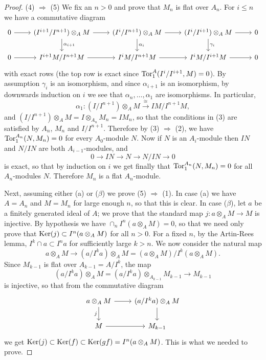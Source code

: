 \begin{proof}
(4) $\Rightarrow$ (5) We fix an $n > 0$ and prove that $M_n$ is flat over $A_n$. For
$i \le n$ we have a commutative diagram
\[
\begin{tikzcd}
0 \arrow[r] &
(I^{i+1}/I^{n+1}) \otimes_A M \arrow[r] \arrow[d, "\alpha_{i+1}"] &
(I^i/I^{n+1}) \otimes_A M \arrow[r] \arrow[d, "\alpha_i"] &
(I^i/I^{i+1}) \otimes_A M \arrow[r] \arrow[d, "\gamma_i"] & 0 \\
0 \arrow[r] &
I^{i+1}M/I^{n+1}M \arrow[r] &
I^iM/I^{n+1}M \arrow[r] &
I^iM/I^{i+1}M \arrow[r] & 0
\end{tikzcd}
\]
with exact rows (the top row is exact since $\operatorname{Tor}^A_1(I^i/I^{i+1}, M) = 0$). By
assumption $\gamma_i$ is an isomorphism, and since $\alpha_{i+1}$ is an isomorphism,
by downwards induction on $i$ we see that $\alpha_n, \ldots, \alpha_1$ are
isomorphisms. In particular,
\[
  \alpha_1\colon (I/I^{n+1}) \otimes_A M \xrightarrow{\cong} IM/I^{n+1}M,
\]
and $(I/I^{n+1}) \otimes_A M = I \otimes_{A_n} M_n = IM_n$,
so that the conditions in (3) are satisfied by $A_n$, $M_n$ and $I/I^{n+1}$.
Therefore by (3) $\Rightarrow$ (2), we have $\operatorname{Tor}^{A_n}_1(N, M_n) = 0$ for every
$A_0$-module $N$. Now if $N$ is an $A_i$-module then $IN$ and $N/IN$ are both
$A_{i-1}$-modules, and
\[
  0 \to IN \to N \to N/IN \to 0
\]
is exact, so that by induction on $i$ we get finally that $\operatorname{Tor}^{A_n}_1(N, M_n) = 0$
for all $A_n$-modules $N$. Therefore $M_n$ is a flat $A_n$-module.

Next, assuming either (a) or ($\beta$) we prove (5) $\Rightarrow$ (1). In case (a) we have
$A = A_n$ and $M = M_n$ for large enough $n$, so that this is clear. In case
($\beta$), let $a$ be a finitely generated ideal of $A$; we prove that the standard map
$j\colon a \otimes_A M \to M$ is injective. By hypothesis we have
$\cap_n I^n(a \otimes_A M) = 0$, so that we need only prove that $\operatorname{Ker}(j) \subset
I^n(a \otimes_A M)$ for all $n > 0$. For a fixed $n$, by the Artin-Rees lemma,
$I^k \cap a \subset I^na$ for sufficiently large $k > n$. We now consider the
natural map
\[
  a \otimes_A M \to (a/I^ka) \otimes_A M = (a \otimes_A M)/I^k(a \otimes_A M).
\]
Since $M_{k-1}$ is flat over $A_{k-1} = A/I^k$, the map
\[
  (a/I^ka) \otimes_A M = (a/I^ka) \otimes_{A_{k-1}} M_{k-1} \to M_{k-1}
\]
is injective, so that from the commutative diagram
\[
\begin{tikzcd}
a \otimes_A M \arrow[r] \arrow[d, "j"'] & (a/I^ka) \otimes_A M \arrow[d] \\
M \arrow[r] & M_{k-1}
\end{tikzcd}
\]
we get $\operatorname{Ker}(j) \subset \operatorname{Ker}(f) \subset \operatorname{Ker}(gf) = I^n(a \otimes_A M)$. This is what
we needed to prove.
\end{proof}

